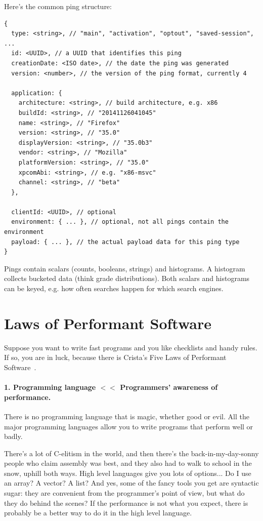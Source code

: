Here's the common ping structure:

{\scriptsize
\begin{verbatim}
{
  type: <string>, // "main", "activation", "optout", "saved-session", ...
  id: <UUID>, // a UUID that identifies this ping
  creationDate: <ISO date>, // the date the ping was generated
  version: <number>, // the version of the ping format, currently 4

  application: {
    architecture: <string>, // build architecture, e.g. x86
    buildId: <string>, // "20141126041045"
    name: <string>, // "Firefox"
    version: <string>, // "35.0"
    displayVersion: <string>, // "35.0b3"
    vendor: <string>, // "Mozilla"
    platformVersion: <string>, // "35.0"
    xpcomAbi: <string>, // e.g. "x86-msvc"
    channel: <string>, // "beta"
  },

  clientId: <UUID>, // optional
  environment: { ... }, // optional, not all pings contain the environment
  payload: { ... }, // the actual payload data for this ping type
}
\end{verbatim}
}

Pings contain scalars (counts, booleans, strings) and histograms. A histogram collects
bucketed data (think grade distributions). Both scalars and histograms can be keyed, e.g.
how often searches happen for which search engines.

\section*{Laws of Performant Software}

Suppose you want to write fast programs and you like checklists and handy rules. If so, you are in luck, because there is Crista's Five Laws of Performant Software~\cite{lpsw}. 

\paragraph{1. Programming language $<<$ Programmers' awareness of performance.}
There is no programming language that is magic, whether good or evil. All the major programming languages allow you to write programs that perform well or badly. 

There's a lot of C-elitism in the world, and then there's the back-in-my-day-sonny people who claim assembly was best, and they also had to walk to school in the snow, uphill both ways.  High level languages give you lots of options... Do I use an array? A vector? A list? And yes, some of the fancy tools you get are syntactic sugar: they are convenient from the programmer's point of view, but what do they do behind the scenes? If the performance is not what you expect, there is probably be a better way to do it in the high level language.

